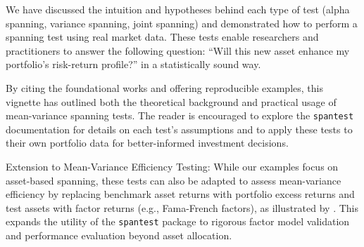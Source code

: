 We have discussed the intuition and hypotheses behind each type of test
(alpha spanning, variance spanning, joint spanning) and demonstrated how
to perform a spanning test using real market data. These tests enable
researchers and practitioners to answer the following question: ``Will
this new asset enhance my portfolio's risk-return profile?'' in a
statistically sound way.

By citing the foundational works \citep{GRS1989, BrittenJones1999, GungorLuger2016} and offering reproducible examples, this vignette has
outlined both the theoretical background and practical usage of
mean-variance spanning tests. The reader is encouraged to explore the
\texttt{spantest} documentation for details on each test's assumptions and to
apply these tests to their own portfolio data for better-informed
investment decisions.

Extension to Mean-Variance Efficiency Testing: While our examples focus
on asset-based spanning, these tests can also be adapted to assess
mean-variance efficiency by replacing benchmark asset returns with
portfolio excess returns and test assets with factor returns (e.g.,
Fama-French factors), as illustrated by \citet{GungorLuger2016}. This expands
the utility of the \texttt{spantest} package to rigorous factor model
validation and performance evaluation beyond asset allocation.



\address{%
Benjamin Seguin\\
HEC Montreal\\%
Department of Decision Science\\ Montreal, Canada\\
%
%
%
\href{mailto:benjamin.seguin@outlook.fr}{\nolinkurl{benjamin.seguin@outlook.fr}}%
}

\address{%
David Ardia\\
HEC Montreal\\%
Department of Decision Science\\ Montreal, Canada\\
%
%
%
\href{mailto:david.ardia.ch@gmail.com}{\nolinkurl{david.ardia.ch@gmail.com}}%
}
